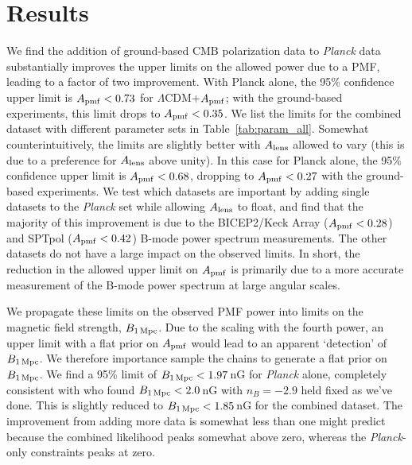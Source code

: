 \documentclass[apj]{emulateapj}
\newcommand{\apmf}{\ensuremath{A_{\rm pmf}}}
\newcommand{\bpmf}{\ensuremath{B_{\rm 1\,Mpc}}}
\newcommand{\alens}{\ensuremath{A_{\rm lens}}}
\newcommand{\lcdm}{\ensuremath{\Lambda}CDM}
\newcommand{\planck}{{\sl Planck}}
\newcommand{\bicepkeck}{BICEP2/Keck Array}
\newcommand{\sptpol}{SPTpol}
\begin{document}
\section{Results}
\label{sec:results}

We find the addition of ground-based CMB polarization data to \planck{} data substantially improves the upper limits on the allowed power due to a PMF, leading to a factor of two improvement. 
With Planck alone, the 95\% confidence upper limit is $\apmf <  0.73$ for \lcdm{}+\apmf{}; with the ground-based experiments, this limit drops to $\apmf <  0.35$. 
We list the limits for the combined dataset  with different parameter sets in Table~\ref{tab:param_all}. 
Somewhat counterintuitively, the limits are slightly better with \alens{} allowed to vary (this is due to a preference for \alens{} above unity). 
In this case for  Planck alone, the 95\% confidence upper limit is $\apmf <  0.68$, dropping to $\apmf <  0.27$ with the ground-based experiments. 
We test which datasets are important by adding single datasets to the \planck{} set while allowing \alens{} to float, and find that the majority of this improvement is due to the \bicepkeck{} ($\apmf <  0.28$) and \sptpol{} ($\apmf <  0.42$) B-mode power spectrum measurements. 
The other datasets do not have a large impact on the observed limits. 
In short, the reduction in the allowed upper limit on \apmf{} is primarily due to a more accurate measurement of the B-mode power spectrum at large angular scales. 



We propagate these limits on the observed PMF power into limits on the magnetic field strength, \bpmf. 
Due to the scaling with the fourth power, an upper limit with a flat prior on \apmf{} would lead to an apparent `detection' of \bpmf. 
We therefore importance sample the chains to generate a flat prior on \bpmf. 
We find a 95\% limit of $\bpmf < 1.97$\,nG for \planck{} alone, completely consistent with \citep{planck15-19} who found $\bpmf < 2.0$\,nG with $n_B=-2.9$ held fixed as we've done. 
This is slightly reduced to $\bpmf < 1.85$\,nG for the combined dataset. 
The improvement from adding more data is somewhat less than one might predict because the combined likelihood peaks somewhat above zero, whereas the \planck{}-only constraints peaks at zero. 
\end{document}
